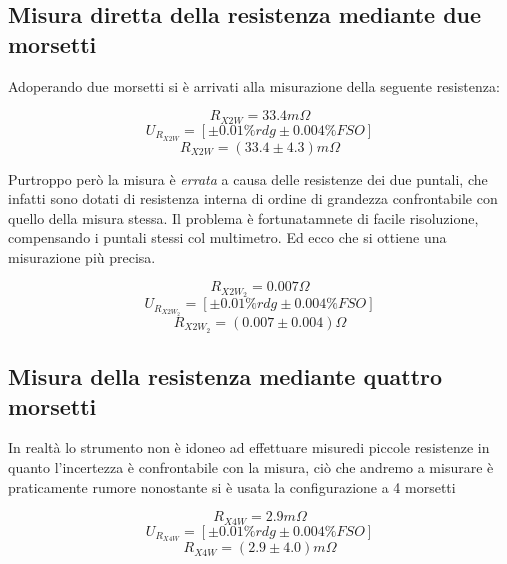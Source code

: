 \documentclass[a4paper]{article}
\begin{document}
\subsection{Misura diretta della resistenza mediante due morsetti}
Adoperando due morsetti si è arrivati alla misurazione della seguente resistenza:
\begin{Large}
	\begin{equation}
		R_{X2W}= 33.4 m\Omega
	\end{equation}
	\begin{equation}
		U_{R_{X2W}} = [\pm 0.01\%rdg \pm 0.004\% FSO]
	 \end{equation}
	 \begin{equation}
		R_{X2W} = (33.4 \pm 4.3)m \Omega
	 \end{equation}
\end{Large}
Purtroppo però la misura è \emph{errata} a causa delle resistenze dei due puntali, che infatti sono dotati di resistenza interna di ordine di grandezza confrontabile con quello della misura stessa.
Il problema è fortunatamnete di facile risoluzione, compensando i puntali stessi col multimetro. Ed ecco che si ottiene una misurazione più precisa.

\begin{Large}
	\begin{equation}
		R_{X2W_{2}} = 0.007 \Omega
	 \end{equation}
	\begin{equation}
		U_{R_{X2W_{2}}} = [\pm 0.01\%rdg \pm 0.004\% FSO]
	 \end{equation}
	 \begin{equation}
		R_{X2W_{2}} = (0.007 \pm 0.004) \Omega
	 \end{equation}
\end{Large}
\subsection{Misura della resistenza mediante quattro morsetti}
In realtà lo strumento non è idoneo ad effettuare misuredi piccole resistenze in quanto l'incertezza è confrontabile con la misura, 
ciò che andremo a misurare è praticamente rumore nonostante si è usata la configurazione a 4 morsetti 
\begin{Large}
	\begin{equation}
		R_{X4W}= 2.9m \Omega
	\end{equation}
	\begin{equation}
		U_{R_{X4W}} = [\pm 0.01\%rdg \pm 0.004\% FSO]
	 \end{equation}
	 \begin{equation}
		R_{X4W} = (2.9\pm 4.0)m \Omega
	 \end{equation}
\end{Large}
\end{document}
